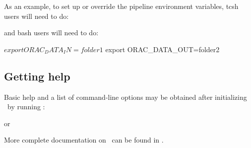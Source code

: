 As an example, to set up or override the pipeline environment variables, tcsh users will need to do:

\begin{terminalv}
\end{terminalv}

and bash users will need to do:

\begin{terminalv}
$ export ORAC_DATA_IN=folder1
$ export ORAC_DATA_OUT=folder2
\end{terminalv}
 

\subsection{Getting help}

Basic help and a list of command-line options may be obtained after
initializing \oracdr\ by running :
\begin{terminalv}
\end{terminalv}
or
\begin{terminalv}
\end{terminalv}

More complete documentation on \oracdr\ can be found in \oracsun.

